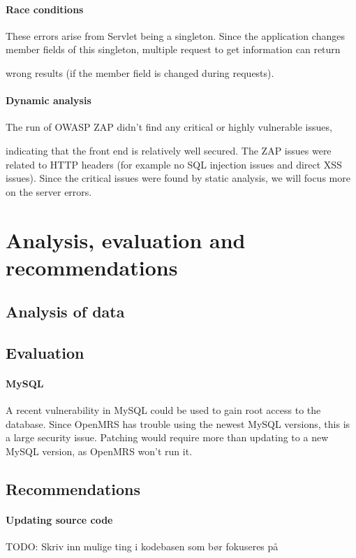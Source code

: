 \documentclass{report} %
\begin{document}
\paragraph{Race conditions}
These errors arise from Servlet being a singleton. Since the application changes
member fields of this singleton, multiple request to get information can return


wrong results (if the member field is changed during requests). 

\paragraph{Dynamic analysis}
The run of OWASP ZAP didn't find any critical or highly vulnerable issues,

indicating that the front end is relatively well secured. The ZAP issues were
related to HTTP headers (for example no SQL injection issues and direct XSS
issues). Since the critical issues were found by static analysis, we will focus
more on the server errors.

\section{Analysis, evaluation and recommendations}  
\subsection{Analysis of data}

\subsection{Evaluation}
\paragraph{MySQL}
A recent vulnerability in MySQL could be used to gain root access to the
database. Since OpenMRS has trouble using the newest MySQL versions, this is a
large security issue. Patching would require more than updating to a new MySQL
version, as OpenMRS won't run it. \autocite[]{Threatpost}

\subsection{Recommendations}
\paragraph{Updating source code}
TODO: Skriv inn mulige ting i kodebasen som bør fokuseres på
\end{document}
